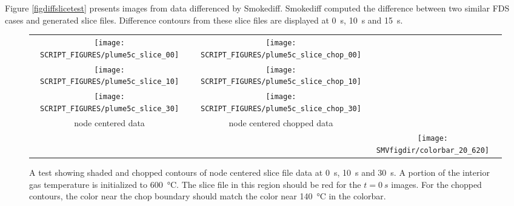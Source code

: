 \documentclass[11pt,twoside]{book}
\begin{document}
Figure \ref{figdiffslicetest} presents images from data differenced by Smokediff.
Smokediff computed the difference between two similar FDS cases and generated slice
files. Difference contours from these slice files are displayed at \SI{0}{s},
\SI{10}{s} and \SI{15}{s}.

\begin{figure}[bph]
\begin{center}
\begin{tabular}{cccp{1.0in}}
 \texttt{[image: SCRIPT\_FIGURES/plume5c\_slice\_00]}&
 \texttt{[image: SCRIPT\_FIGURES/plume5c\_slice\_chop\_00]}\\

 \texttt{[image: SCRIPT\_FIGURES/plume5c\_slice\_10]}&
 \texttt{[image: SCRIPT\_FIGURES/plume5c\_slice\_chop\_10]}\\

 \texttt{[image: SCRIPT\_FIGURES/plume5c\_slice\_30]}&
 \texttt{[image: SCRIPT\_FIGURES/plume5c\_slice\_chop\_30]}\\

 node centered data&node centered chopped data\\
&&\raisebox{0.5in}[0pt]{\texttt{[image: \\SMVfigdir/colorbar\_20\_620]}}\\
 \end{tabular}
\end{center}
 \caption[A test showing shaded and chopped contours of node centered slice
 file data]{A test showing shaded and chopped contours of node centered slice
 file data at \SI{0}{s}, \SI{10}{s} and \SI{30}{s}.  A portion of the interior
 gas temperature is initialized to \SI{600}{\degreeCelsius}.  The slice file
 in this region should be red for the $t=\SI{0}{s}$ images.  For the chopped
 contours, the color near the chop boundary should match the color near
 \SI{140}{\degreeCelsius} in the colorbar.}
\label{fignodeslicetest}%
\end{figure}
\end{document}
